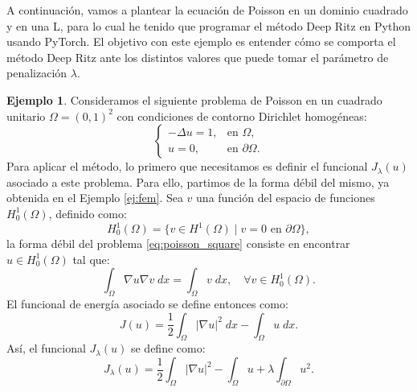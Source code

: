 \documentclass[a4paper,11pt,spanish, twoside, leqno]{tfg-uam}
\theoremstyle{definition}
\newtheorem{exmp}[teor]{Ejemplo}
\begin{document}
A continuación, vamos a plantear la ecuación de Poisson en un dominio cuadrado y en una L, para lo cual he tenido que programar el método Deep Ritz en Python usando PyTorch. El objetivo con este ejemplo es entender cómo se comporta el método Deep Ritz ante los distintos valores que puede tomar el parámetro de penalización $\lambda$.

\begin{mdframed}
    \begin{exmp}
        Consideramos el siguiente problema de Poisson en un cuadrado unitario $\Omega = (0,1)^2$ con condiciones de contorno Dirichlet homogéneas:
        \begin{equation}\label{eq:poisson_square}
        \begin{cases}
        -\Delta u = 1, & \text{en } \Omega,\\
        u = 0, & \text{en } \partial \Omega.
        \end{cases}            
        \end{equation}
        Para aplicar el método, lo primero que necesitamos es definir el funcional $J_\lambda(u)$ asociado a este problema. Para ello, partimos de la forma débil del mismo, ya obtenida en el Ejemplo \ref{ej:fem}. Sea $v$ una función del espacio de funciones $H_0^1(\Omega)$, definido como:
        \begin{equation*}
        H_0^1(\Omega) = \{ v \in H^1(\Omega) \mid v = 0 \text{ en } \partial \Omega \},
        \end{equation*}
        la forma débil del problema \eqref{eq:poisson_square} consiste en encontrar $u \in H_0^1(\Omega)$ tal que:
        \begin{equation*}
        \int_{\Omega} \nabla u\nabla v \; dx = \int_{\Omega} v \; dx, \quad \forall v \in H_0^1(\Omega).
        \end{equation*}
        El funcional de energía asociado se define entonces como:
        \begin{equation*}
        J(u) = \frac{1}{2} \int_{\Omega} |\nabla u|^2 \;dx - \int_{\Omega} u \;dx.
        \end{equation*}
        Así, el funcional $J_\lambda(u)$ se define como:
        \begin{equation*}
        J_\lambda(u) = \frac{1}{2} \int_\Omega |\nabla u|^2 - \int_\Omega u + \lambda \int_{\partial \Omega} u^2.
        \end{equation*}

\end{exmp}
\end{mdframed}
\end{document}
